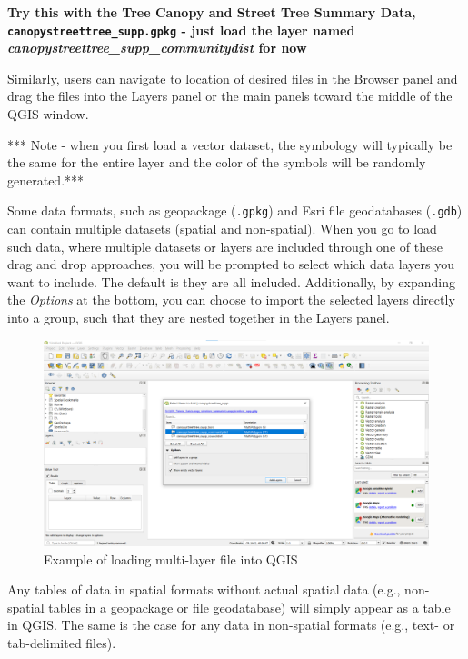 \documentclass[
  letterpaper,
  DIV=11,
  numbers=noendperiod]{scrreprt}
\begin{document}
\textbf{Try this with the Tree Canopy and Street Tree Summary Data,
\texttt{canopystreettree\_supp.gpkg} - just load the layer named
\emph{canopystreettree\_supp\_communitydist} for now}

Similarly, users can navigate to location of desired files in the
Browser panel and drag the files into the Layers panel or the main
panels toward the middle of the QGIS window.

*** Note - when you first load a vector dataset, the symbology will
typically be the same for the entire layer and the color of the symbols
will be randomly generated.***

Some data formats, such as geopackage (\texttt{.gpkg}) and Esri file
geodatabases (\texttt{.gdb}) can contain multiple datasets (spatial and
non-spatial). When you go to load such data, where multiple datasets or
layers are included through one of these drag and drop approaches, you
will be prompted to select which data layers you want to include. The
default is they are all included. Additionally, by expanding the
\emph{Options} at the bottom, you can choose to import the selected
layers directly into a group, such that they are nested together in the
Layers panel.

\begin{figure}

{\centering \includegraphics{./images/multi_table_import.png}

}

\caption{Example of loading multi-layer file into QGIS}

\end{figure}

Any tables of data in spatial formats without actual spatial data (e.g.,
non-spatial tables in a geopackage or file geodatabase) will simply
appear as a table in QGIS. The same is the case for any data in
non-spatial formats (e.g., text- or tab-delimited files).
\end{document}
